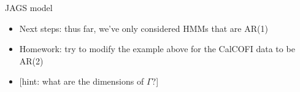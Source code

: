 \documentclass[
  ignorenonframetext,
]{beamer}
\begin{document}
\begin{frame}{JAGS model}
\protect\hypertarget{jags-model-7}{}

\begin{itemize}
\item
  Next steps: thus far, we've only considered HMMs that are AR(1)
\item
  Homework: try to modify the example above for the CalCOFI data to be
  AR(2)
\item
  {[}hint: what are the dimensions of \(\Gamma\)?{]}
\end{itemize}

\end{frame}
\end{document}

